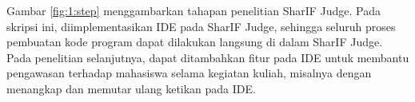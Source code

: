 Gambar \ref{fig:1:step} menggambarkan tahapan penelitian SharIF Judge. Pada skripsi ini, diimplementasikan IDE pada SharIF Judge, sehingga seluruh proses pembuatan kode program dapat dilakukan langsung di dalam SharIF Judge. Pada penelitian selanjutnya, dapat ditambahkan fitur pada IDE untuk membantu pengawasan terhadap mahasiswa selama kegiatan kuliah, misalnya dengan menangkap dan memutar ulang ketikan pada IDE.







